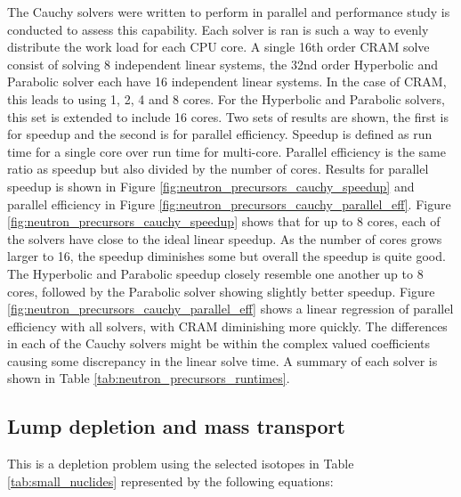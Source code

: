 The Cauchy solvers were written to perform in parallel and performance study is conducted to assess this capability. Each solver is ran is such a way to evenly distribute the work load for each CPU core. A single 16th order CRAM solve consist of solving 8 independent linear systems, the 32nd order Hyperbolic and Parabolic solver each have 16 independent linear systems. In the case of CRAM, this leads to using 1, 2, 4 and 8 cores. For the Hyperbolic and Parabolic solvers, this set is extended to include 16 cores. Two sets of results are shown, the first is for speedup and the second is for parallel efficiency. Speedup is defined as run time for a single core over run time for multi-core. Parallel efficiency is the same ratio as speedup but also divided by the number of cores. Results for parallel speedup is shown in Figure \ref{fig:neutron_precursors_cauchy_speedup} and parallel efficiency in Figure \ref{fig:neutron_precursors_cauchy_parallel_eff}. Figure \ref{fig:neutron_precursors_cauchy_speedup} shows that for up to 8 cores, each of the solvers have close to the ideal linear speedup. As the number of cores grows larger to 16, the speedup diminishes some but overall the speedup is quite good. The Hyperbolic and Parabolic speedup closely resemble one another up to 8 cores, followed by the Parabolic solver showing slightly better speedup. Figure \ref{fig:neutron_precursors_cauchy_parallel_eff} shows a linear regression of parallel efficiency with all solvers, with CRAM diminishing more quickly. The differences in each of the Cauchy solvers might be within the complex valued coefficients causing some discrepancy in the linear solve time. A summary of each solver is shown in Table \ref{tab:neutron_precursors_runtimes}. 

\subsection{Lump depletion and mass transport}
This is a depletion problem using the selected isotopes in Table \ref{tab:small_nuclides} represented by the following equations:

\clearpage


